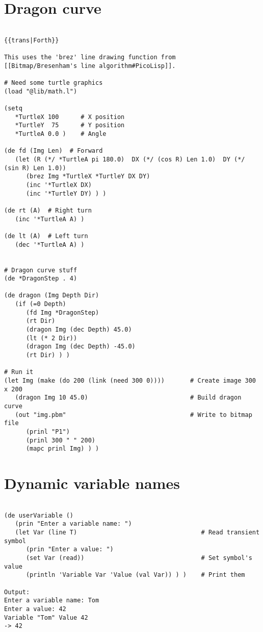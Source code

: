 \section*{Dragon curve}

\begin{verbatim}

{{trans|Forth}}

This uses the 'brez' line drawing function from
[[Bitmap/Bresenham's line algorithm#PicoLisp]].

# Need some turtle graphics
(load "@lib/math.l")

(setq
   *TurtleX 100      # X position
   *TurtleY  75      # Y position
   *TurtleA 0.0 )    # Angle

(de fd (Img Len)  # Forward
   (let (R (*/ *TurtleA pi 180.0)  DX (*/ (cos R) Len 1.0)  DY (*/ (sin R) Len 1.0))
      (brez Img *TurtleX *TurtleY DX DY)
      (inc '*TurtleX DX)
      (inc '*TurtleY DY) ) )

(de rt (A)  # Right turn
   (inc '*TurtleA A) )

(de lt (A)  # Left turn
   (dec '*TurtleA A) )


# Dragon curve stuff
(de *DragonStep . 4)

(de dragon (Img Depth Dir)
   (if (=0 Depth)
      (fd Img *DragonStep)
      (rt Dir)
      (dragon Img (dec Depth) 45.0)
      (lt (* 2 Dir))
      (dragon Img (dec Depth) -45.0)
      (rt Dir) ) )

# Run it
(let Img (make (do 200 (link (need 300 0))))       # Create image 300 x 200
   (dragon Img 10 45.0)                            # Build dragon curve
   (out "img.pbm"                                  # Write to bitmap file
      (prinl "P1")
      (prinl 300 " " 200)
      (mapc prinl Img) ) )

\end{verbatim}

\section*{Dynamic variable names}

\begin{verbatim}

(de userVariable ()
   (prin "Enter a variable name: ")
   (let Var (line T)                                  # Read transient symbol
      (prin "Enter a value: ")
      (set Var (read))                                # Set symbol's value
      (println 'Variable Var 'Value (val Var)) ) )    # Print them

Output:
Enter a variable name: Tom
Enter a value: 42
Variable "Tom" Value 42
-> 42

\end{verbatim}

